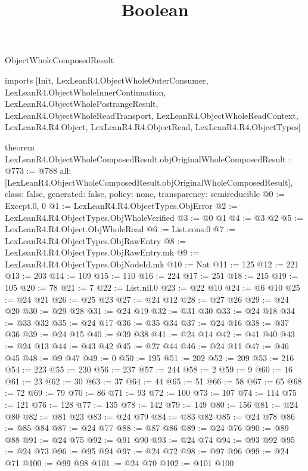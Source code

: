 \begin{lexlean}{ObjectWholeComposedResult}
\title{Boolean}
\begin{coremodule}
imports [Init, LexLeanR4.ObjectWholeOuterConsumer, LexLeanR4.ObjectWholeInnerContinuation, LexLeanR4.ObjectWholePostrangeResult, LexLeanR4.ObjectWholeReadTransport, LexLeanR4.ObjectWholeReadContext, LexLeanR4.R4.Object, LexLeanR4.R4.ObjectRead, LexLeanR4.R4.ObjectTypes]

theorem LexLeanR4.ObjectWholeComposedResult.objOriginalWholeComposedResult : @773 := @788 {
  all: [LexLeanR4.ObjectWholeComposedResult.objOriginalWholeComposedResult],
  class: false,
  generated: false,
  policy: none,
  transparency: semireducible
}
@0 := Except.{0, 0}
@1 := LexLeanR4.R4.ObjectTypes.ObjError
@2 := LexLeanR4.R4.ObjectTypes.ObjWholeVerified
@3 := @0 @1
@4 := @3 @2
@5 := LexLeanR4.R4.Object.ObjWholeRead
@6 := List.cons.{0}
@7 := LexLeanR4.R4.ObjectTypes.ObjRawEntry
@8 := LexLeanR4.R4.ObjectTypes.ObjRawEntry.mk
@9 := LexLeanR4.R4.ObjectTypes.ObjNodeId.mk
@10 := Nat
@11 := 125
@12 := 221
@13 := 203
@14 := 109
@15 := 110
@16 := 224
@17 := 251
@18 := 215
@19 := 105
@20 := 78
@21 := 7
@22 := List.nil.{0}
@23 := @22 @10
@24 := @6 @10
@25 := @24 @21
@26 := @25 @23
@27 := @24 @12
@28 := @27 @26
@29 := @24 @20
@30 := @29 @28
@31 := @24 @19
@32 := @31 @30
@33 := @24 @18
@34 := @33 @32
@35 := @24 @17
@36 := @35 @34
@37 := @24 @16
@38 := @37 @36
@39 := @24 @15
@40 := @39 @38
@41 := @24 @14
@42 := @41 @40
@43 := @24 @13
@44 := @43 @42
@45 := @27 @44
@46 := @24 @11
@47 := @46 @45
@48 := @9 @47
@49 := 0
@50 := 195
@51 := 202
@52 := 209
@53 := 216
@54 := 223
@55 := 230
@56 := 237
@57 := 244
@58 := 2
@59 := 9
@60 := 16
@61 := 23
@62 := 30
@63 := 37
@64 := 44
@65 := 51
@66 := 58
@67 := 65
@68 := 72
@69 := 79
@70 := 86
@71 := 93
@72 := 100
@73 := 107
@74 := 114
@75 := 121
@76 := 128
@77 := 135
@78 := 142
@79 := 149
@80 := 156
@81 := @24 @80
@82 := @81 @23
@83 := @24 @79
@84 := @83 @82
@85 := @24 @78
@86 := @85 @84
@87 := @24 @77
@88 := @87 @86
@89 := @24 @76
@90 := @89 @88
@91 := @24 @75
@92 := @91 @90
@93 := @24 @74
@94 := @93 @92
@95 := @24 @73
@96 := @95 @94
@97 := @24 @72
@98 := @97 @96
@99 := @24 @71
@100 := @99 @98
@101 := @24 @70
@102 := @101 @100

\end{coremodule}
\end{lexlean}
